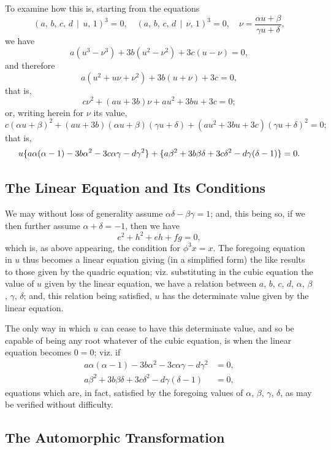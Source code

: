 \documentclass[11pt,a4paper]{article}
\theoremstyle{cayley}
\begin{document}
To examine how this is, starting from the equations
\[
(a,\, b,\, c,\, d \,\!\!\mid\!\!\, u,\, 1)^{3} = 0,\quad (a,\, b,\, c,\, d \,\!\!\mid\!\!\, \nu,\, 1)^{3} = 0,\quad \nu = \frac{\alpha u + \beta}{\gamma u + \delta},
\]
we have
\[
a(u^{3} - \nu^{3}) + 3b(u^{2} - \nu^{2}) + 3c(u - \nu) = 0,
\]
and therefore
\[
a(u^{2} + u\nu + \nu^{2}) + 3b(u + \nu) + 3c = 0,
\]
that is,
\[
c\nu^{2} + (au + 3b)\nu + au^{2} + 3bu + 3c = 0;
\]
or, writing herein for $\nu$ its value,
\[
c(\alpha u + \beta)^{2} + (au + 3b)(\alpha u + \beta)(\gamma u + \delta) + (au^{2} + 3bu + 3c)(\gamma u + \delta)^{2} = 0;
\]
that is,
\[
u \{a\alpha(\alpha - 1) - 3b\alpha^{2} - 3c\alpha\gamma - d\gamma^{2}\} \\
+ \{a\beta^{2} + 3b\beta\delta + 3c\delta^{2} - d\gamma(\delta - 1)\} = 0.
\]

\subsection*{The Linear Equation and Its Conditions}

We may without loss of generality assume $\alpha\delta - \beta\gamma = 1$; and, this being so, if we then further assume $\alpha + \delta = -1$, then we have
\[
e^{2} + h^{2} + eh + fg = 0,
\]
which is, as above appearing, the condition for $\phi^{3}x = x$. The foregoing equation in $u$ thus becomes a linear equation giving (in a simplified form) the like results to those given by the quadric equation; viz. substituting in the cubic equation the value of $u$ given by the linear equation, we have a relation between $a$, $b$, $c$, $d$, $\alpha$, $\beta$, $\gamma$, $\delta$; and, this relation being satisfied, $u$ has the determinate value given by the linear equation.

The only way in which $u$ can cease to have this determinate value, and so be capable of being any root whatever of the cubic equation, is when the linear equation becomes $0 = 0$; viz. if
\begin{align*}
a\alpha(\alpha - 1) - 3b\alpha^{2} - 3c\alpha\gamma - d\gamma^{2} &= 0,\\
a\beta^{2} + 3b\beta\delta + 3c\delta^{2} - d\gamma(\delta - 1) &= 0,
\end{align*}
equations which are, in fact, satisfied by the foregoing values of $\alpha$, $\beta$, $\gamma$, $\delta$, as may be verified without difficulty.

\subsection*{The Automorphic Transformation}
\end{document}
